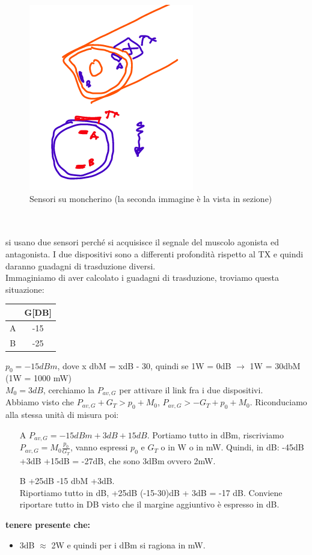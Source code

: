 \documentclass[oneside, 12pt]{extbook}
\begin{document}
\begin{figure}[!h]
	\includegraphics[scale=0.5]{immagini/moncherino.png}
	\caption{Sensori su moncherino (la seconda immagine è la vista in sezione)}
\end{figure}
\\\\si usano due sensori perché si acquisisce il segnale del muscolo agonista ed antagonista. I due dispositivi sono a differenti profondità rispetto al TX e quindi daranno guadagni di trasduzione diversi.\\Immaginiamo di aver calcolato i guadagni di trasduzione, troviamo questa situazione:
\begin{table}
	\begin{tabular}{|c|c}
		 & G[DB]\\
		 \hline
		 A & -15\\
		 B & -25\\
	\end{tabular}
\end{table}
$p_0 = -15 dBm$, dove x dbM = xdB - 30, quindi se 1W = 0dB $\rightarrow$ 1W = 30dbM (1W = 1000 mW)\\$M_0 = 3dB$, cerchiamo la $P_{av,G}$ per attivare il link fra i due dispositivi.\\Abbiamo visto che $P_{av,G} + G_T > p_0 + M_0$, $P_{av,G} > -G_T + p_0 + M_0$. Riconduciamo alla stessa unità di misura poi:
\begin{itemize}
	\item[A] $P_{av,G} = -15dBm + 3dB + 15dB$. Portiamo tutto in dBm, riscriviamo $P_{av,G} = M_0\frac{p_0}{G_T}$, vanno espressi $p_0$ e $G_T$ o in W o in mW. Quindi, in dB: -45dB +3dB +15dB = -27dB, che sono 3dBm ovvero 2mW.
	\item[B] +25dB -15 dbM +3dB.\\Riportiamo tutto in dB, +25dB (-15-30)dB + 3dB = -17 dB. Conviene riportare tutto in DB visto che il margine aggiuntivo è espresso in dB.
\end{itemize}
\textbf{tenere presente che:}
\begin{itemize}
	\item 3dB $\approx$ 2W e quindi per i dBm si ragiona in mW.
\end{itemize}
\end{document}
